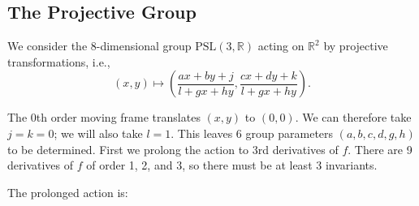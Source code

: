 \documentclass[review,onefignum,onetabnum]{siamonline190516}
\def\R{\mathbb{R}}
\begin{document}
\subsection{The Projective Group}

We consider the 8-dimensional group $\mathrm{PSL}(3,\R)$ acting on $\R^2$ by projective transformations, i.e., $$(x,y) \mapsto \left(\frac{a x + b y + j}{l + g x + h y}, \frac{c x + d y + k}{l+ g x + h y}\right).$$

The 0th order moving frame translates $(x,y)$ to $(0,0)$. We can therefore take $j=k=0$; we will also take $l=1$. This leaves 6 group parameters $(a,b,c,d,g,h)$ to be determined. First we prolong the action to 3rd derivatives of $f$. There are 9 derivatives of $f$ of order 1, 2, and 3, so there must be at least 3 invariants.

The prolonged action is:
\end{document}
